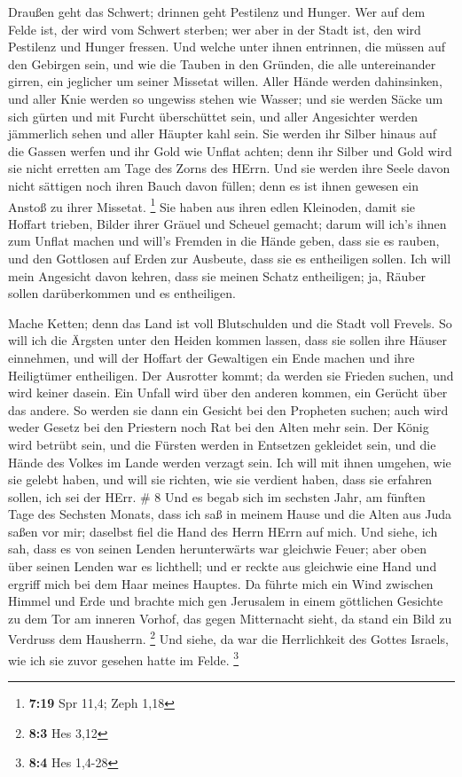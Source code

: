  Draußen geht das Schwert; drinnen geht Pestilenz und
Hunger. Wer auf dem Felde ist, der wird vom Schwert sterben; wer aber in
der Stadt ist, den wird Pestilenz und Hunger fressen.  Und
welche unter ihnen entrinnen, die müssen auf den Gebirgen sein, und wie
die Tauben in den Gründen, die alle untereinander girren, ein jeglicher
um seiner Missetat willen.  Aller Hände werden dahinsinken,
und aller Knie werden so ungewiss stehen wie Wasser;  und
sie werden Säcke um sich gürten und mit Furcht überschüttet sein, und
aller Angesichter werden jämmerlich sehen und aller Häupter kahl sein.
 Sie werden ihr Silber hinaus auf die Gassen werfen und ihr
Gold wie Unflat achten; denn ihr Silber und Gold wird sie nicht erretten
am Tage des Zorns des HErrn. Und sie werden ihre Seele davon nicht
sättigen noch ihren Bauch davon füllen; denn es ist ihnen gewesen ein
Anstoß zu ihrer Missetat. \footnote{\textbf{7:19} Spr 11,4; Zeph 1,18}
 Sie haben aus ihren edlen Kleinoden, damit sie Hoffart
trieben, Bilder ihrer Gräuel und Scheuel gemacht; darum will ich's ihnen
zum Unflat machen  und will's Fremden in die Hände geben,
dass sie es rauben, und den Gottlosen auf Erden zur Ausbeute, dass sie
es entheiligen sollen.  Ich will mein Angesicht davon
kehren, dass sie meinen Schatz entheiligen; ja, Räuber sollen
darüberkommen und es entheiligen.

 Mache Ketten; denn das Land ist voll Blutschulden und die
Stadt voll Frevels.  So will ich die Ärgsten unter den
Heiden kommen lassen, dass sie sollen ihre Häuser einnehmen, und will
der Hoffart der Gewaltigen ein Ende machen und ihre Heiligtümer
entheiligen.  Der Ausrotter kommt; da werden sie Frieden
suchen, und wird keiner dasein.  Ein Unfall wird über den
anderen kommen, ein Gerücht über das andere. So werden sie dann ein
Gesicht bei den Propheten suchen; auch wird weder Gesetz bei den
Priestern noch Rat bei den Alten mehr sein.  Der König wird
betrübt sein, und die Fürsten werden in Entsetzen gekleidet sein, und
die Hände des Volkes im Lande werden verzagt sein. Ich will mit ihnen
umgehen, wie sie gelebt haben, und will sie richten, wie sie verdient
haben, dass sie erfahren sollen, ich sei der HErr. \# 8  Und
es begab sich im sechsten Jahr, am fünften Tage des Sechsten Monats,
dass ich saß in meinem Hause und die Alten aus Juda saßen vor mir;
daselbst fiel die Hand des Herrn HErrn auf mich.  Und siehe,
ich sah, dass es von seinen Lenden herunterwärts war gleichwie Feuer;
aber oben über seinen Lenden war es lichthell;  und er
reckte aus gleichwie eine Hand und ergriff mich bei dem Haar meines
Hauptes. Da führte mich ein Wind zwischen Himmel und Erde und brachte
mich gen Jerusalem in einem göttlichen Gesichte zu dem Tor am inneren
Vorhof, das gegen Mitternacht sieht, da stand ein Bild zu Verdruss dem
Hausherrn. \footnote{\textbf{8:3} Hes 3,12}  Und siehe, da
war die Herrlichkeit des Gottes Israels, wie ich sie zuvor gesehen hatte
im Felde. \footnote{\textbf{8:4} Hes 1,4-28}

